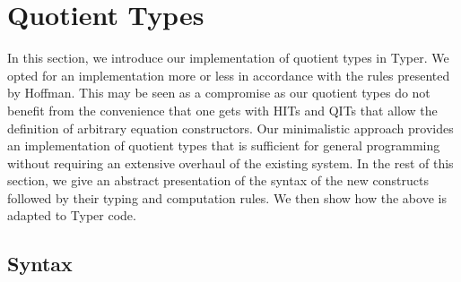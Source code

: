 \documentclass[12pt,twoside,maitrise]{dms}
\theoremstyle{definition}
\numberwithin{equation}{section}
\numberwithin{table}{chapter}
\numberwithin{figure}{chapter}
\newcommand\id[1] {\texttt{#1}}
\begin{document}




\section{Quotient Types}\label{sec:quot}

In this section, we introduce our implementation of quotient types in Typer. We
opted for an implementation more or less in accordance with the rules presented
by Hoffman\cite[Chap~5.1.5]{hofmann1995extensional}. This may be seen as a
compromise as our quotient types do not benefit from the convenience that one
gets with HITs and QITs that allow the definition of arbitrary equation
constructors. Our minimalistic approach provides an implementation of quotient
types that is sufficient for general programming without requiring an extensive
overhaul of the existing system. In the rest of this section, we give an
abstract presentation of the syntax of the new constructs followed by their
typing and computation rules. We then show how the above is adapted to Typer
code.

\subsection{Syntax}\label{sec:quot-syntax}
\end{document}
